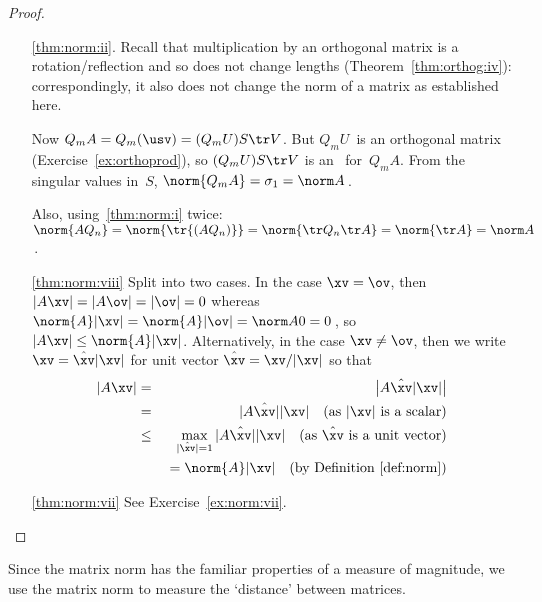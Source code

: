 \begin{proof}
\begin{itemize}
\item[\ref{thm:norm:ii}.]
Recall that multiplication by an orthogonal matrix is a rotation\slash reflection and so does not change lengths (Theorem~\ref{thm:orthog:iv}): correspondingly, it also does not change the norm of a matrix as established here.

Now \(Q_mA=Q_m(\usv)=(Q_mU)S\tr V\).
But \(Q_mU\)~is an orthogonal matrix (Exercise~\ref{ex:orthoprod}),
so \((Q_mU)S\tr V\) is an \svd\ for~\(Q_mA\).
From the singular values in~\(S\), \(\norm{Q_mA}=\sigma_1=\norm A\)\,.

Also, using~\ref{thm:norm:i} twice: \(\norm{AQ_n}=\norm{\tr{(AQ_n)}}=\norm{\tr Q_n\tr A}=\norm{\tr A}=\norm A\)\,.

\item[\ref{thm:norm:viii}]
Split into two cases.
In the case \(\xv=\ov\), then \(|A\xv|=|A\ov|=|\ov|=0\) whereas \(\norm{A}|\xv|=\norm{A}|\ov|=\norm A0=0\)\,, so \(|A\xv|\leq\norm{A}|\xv|\).
Alternatively, in the case \(\xv\neq\ov\), then we write \(\xv=\hat{\xv}|\xv|\) for unit vector \(\hat{\xv}=\xv/|\xv|\)  so that
\begin{eqnarray*}
|A\xv|&=&\big|A\hat{\xv}|\xv|\big|
\\&=&|A\hat{\xv}||\xv| \quad(\text{as }|\xv|\text{ is a scalar})
\\&\leq&\max_{|\hat{\xv}|=1}|A\hat{\xv}||\xv|
\quad(\text{as }\hat{\xv}\text{ is a unit vector})
\\&&{}=\norm{A}|\xv|\quad(\text{by Definition~\ref{def:norm}})
\end{eqnarray*}


\item[\ref{thm:norm:vii}] See Exercise~\ref{ex:norm:vii}.
\end{itemize}
\end{proof}




Since the matrix norm has the familiar properties of a measure of magnitude, we use the matrix norm to measure the `distance' between matrices.

